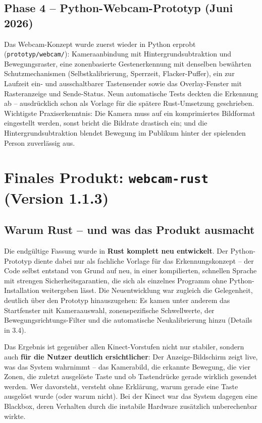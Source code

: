 \documentclass[12pt,a4paper]{article}
\newcommand{\code}[1]{\texttt{#1}}
\begin{document}
\subsection{Phase 4 -- Python-Webcam-Prototyp (Juni 2026)}

Das Webcam-Konzept wurde zuerst wieder in Python erprobt (\code{prototyp/webcam/}): Kameraanbindung mit Hintergrundsubtraktion und Bewegungsraster, eine zonenbasierte Gestenerkennung mit denselben bewährten Schutzmechanismen (Selbstkalibrierung, Sperrzeit, Flacker-Puffer), ein zur Laufzeit ein- und ausschaltbarer Tastensender sowie das Overlay-Fenster mit Rasteranzeige und Sende-Status. Neun automatische Tests deckten die Erkennung ab -- ausdrücklich schon als Vorlage für die spätere Rust-Umsetzung geschrieben. Wichtigste Praxiserkenntnis: Die Kamera muss auf ein komprimiertes Bildformat eingestellt werden, sonst bricht die Bildrate drastisch ein; und die Hintergrundsubtraktion blendet Bewegung im Publikum hinter der spielenden Person zuverlässig aus.

\section{Finales Produkt: \code{webcam-rust} (Version 1.1.3)}

\subsection{Warum Rust -- und was das Produkt ausmacht}

Die endgültige Fassung wurde in \textbf{Rust komplett neu entwickelt}. Der Python-Prototyp diente dabei nur als fachliche Vorlage für das Erkennungskonzept -- der Code selbst entstand von Grund auf neu, in einer kompilierten, schnellen Sprache mit strengen Sicherheitsgarantien, die sich als einzelnes Programm ohne Python-Installation weitergeben lässt. Die Neuentwicklung war zugleich die Gelegenheit, deutlich über den Prototyp hinauszugehen: Es kamen unter anderem das Startfenster mit Kameraauswahl, zonenspezifische Schwellwerte, der Bewegungsrichtungs-Filter und die automatische Neukalibrierung hinzu (Details in 3.4).

Das Ergebnis ist gegenüber allen Kinect-Vorstufen nicht nur stabiler, sondern auch \textbf{für die Nutzer deutlich ersichtlicher}: Der Anzeige-Bildschirm zeigt live, was das System wahrnimmt -- das Kamerabild, die erkannte Bewegung, die vier Zonen, die zuletzt ausgelöste Taste und ob Tastendrücke gerade wirklich gesendet werden. Wer davorsteht, versteht ohne Erklärung, warum gerade eine Taste ausgelöst wurde (oder warum nicht). Bei der Kinect war das System dagegen eine Blackbox, deren Verhalten durch die instabile Hardware zusätzlich unberechenbar wirkte.
\end{document}
